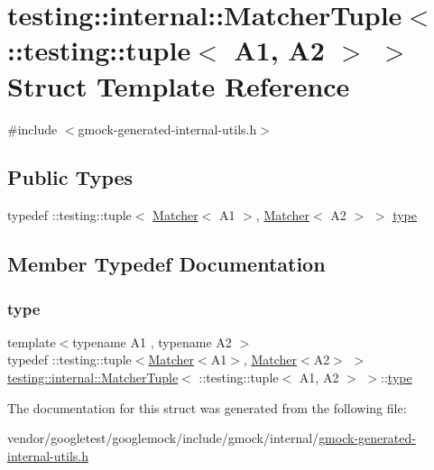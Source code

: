 \hypertarget{structtesting_1_1internal_1_1_matcher_tuple_3_01_1_1testing_1_1tuple_3_01_a1_00_01_a2_01_4_01_4}{}\section{testing\+:\+:internal\+:\+:Matcher\+Tuple$<$ \+:\+:testing\+:\+:tuple$<$ A1, A2 $>$ $>$ Struct Template Reference}
\label{structtesting_1_1internal_1_1_matcher_tuple_3_01_1_1testing_1_1tuple_3_01_a1_00_01_a2_01_4_01_4}


{\ttfamily \#include $<$gmock-\/generated-\/internal-\/utils.\+h$>$}

\subsection*{Public Types}
\begin{DoxyCompactItemize}
\item 
typedef \+::testing\+::tuple$<$ \hyperlink{classtesting_1_1_matcher}{Matcher}$<$ A1 $>$, \hyperlink{classtesting_1_1_matcher}{Matcher}$<$ A2 $>$ $>$ \hyperlink{structtesting_1_1internal_1_1_matcher_tuple_3_01_1_1testing_1_1tuple_3_01_a1_00_01_a2_01_4_01_4_a0ba88406203fde086f85abbf68ce2924}{type}
\end{DoxyCompactItemize}


\subsection{Member Typedef Documentation}
\mbox{\label{structtesting_1_1internal_1_1_matcher_tuple_3_01_1_1testing_1_1tuple_3_01_a1_00_01_a2_01_4_01_4_a0ba88406203fde086f85abbf68ce2924}} 
\subsubsection{\texorpdfstring{type}{type}}
{\footnotesize\ttfamily template$<$typename A1 , typename A2 $>$ \\
typedef \+::testing\+::tuple$<$\hyperlink{classtesting_1_1_matcher}{Matcher}$<$A1$>$, \hyperlink{classtesting_1_1_matcher}{Matcher}$<$A2$>$ $>$ \hyperlink{structtesting_1_1internal_1_1_matcher_tuple}{testing\+::internal\+::\+Matcher\+Tuple}$<$ \+::testing\+::tuple$<$ A1, A2 $>$ $>$\+::\hyperlink{structtesting_1_1internal_1_1_matcher_tuple_3_01_1_1testing_1_1tuple_3_01_a1_00_01_a2_01_4_01_4_a0ba88406203fde086f85abbf68ce2924}{type}}



The documentation for this struct was generated from the following file\+:\begin{DoxyCompactItemize}
\item 
vendor/googletest/googlemock/include/gmock/internal/\hyperlink{gmock-generated-internal-utils_8h}{gmock-\/generated-\/internal-\/utils.\+h}\end{DoxyCompactItemize}
